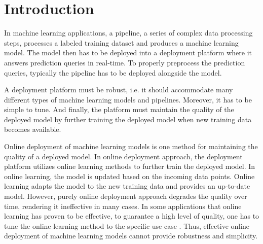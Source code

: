 \section{Introduction} \label{introduction}
In machine learning applications, a pipeline, a series of complex data processing steps, processes a labeled training dataset and produces a machine learning model.
The model then has to be deployed into a deployment platform where it answers prediction queries in real-time.
To properly preprocess the prediction queries, typically the pipeline has to be deployed alongside the model.

A deployment platform must be robust, i.e. it should accommodate many different types of machine learning models and pipelines.
Moreover, it has to be simple to tune.
And finally, the platform must maintain the quality of the deployed model by further training the deployed model when new training data becomes available.

Online deployment of machine learning models is one method for maintaining the quality of a deployed model.
In online deployment approach, the deployment platform utilizes online learning methods to further train the deployed model.
In online learning, the model is updated based on the incoming data points.
Online learning adapts the model to the new training data and provides an up-to-date model.
However, purely online deployment approach degrades the quality over time, rendering it ineffective in many cases.
In some applications that online learning has proven to be effective, to guarantee a high level of quality, one has to tune the online learning method to the specific use case \cite{ma2009identifying, macmahan2013}.
Thus, effective online deployment of machine learning models cannot provide robustness and simplicity.



